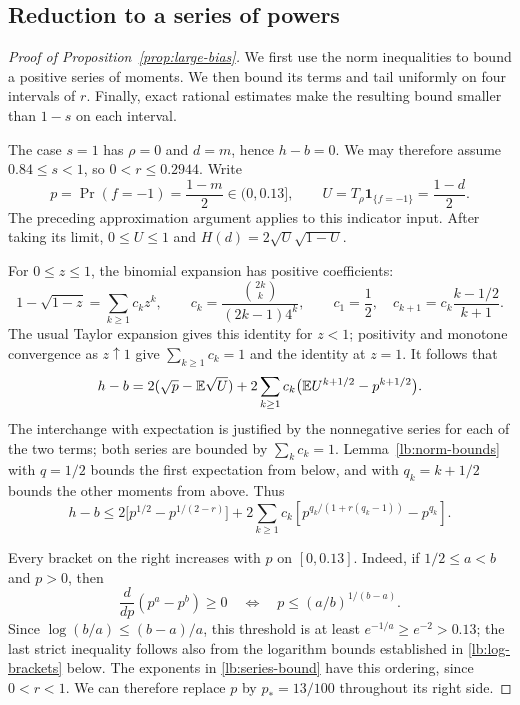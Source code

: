 \subsection{Reduction to a series of powers}

\begin{proof}[Proof of Proposition~\ref{prop:large-bias}]
We first use the norm inequalities to bound a positive series of moments.
We then bound its terms and tail uniformly on four intervals of $r$.
Finally, exact rational estimates make the resulting bound smaller than
$1-s$ on each interval.

The case $s=1$ has $\rho=0$ and $d=m$, hence $h-b=0$.
We may therefore assume $0.84\le s<1$, so $0<r\le0.2944$.
Write
\[
 p=\Pr(f=-1)=\frac{1-m}{2}\in(0,0.13],\qquad
 U=T_\rho\mathbf1_{\{f=-1\}}=\frac{1-d}{2}.
\]
The preceding approximation argument applies to this indicator input.
After taking its limit, $0\le U\le1$ and
$H(d)=2\sqrt U\sqrt{1-U}$.

For $0\le z\le1$, the binomial expansion has positive coefficients:
\begin{equation}\label{lb:binomial}
 1-\sqrt{1-z}=\sum_{k\ge1}c_kz^k,\qquad
 c_k=\frac{\binom{2k}{k}}{(2k-1)4^k},\qquad
 c_1=\frac12,\quad
 c_{k+1}=c_k\frac{k-1/2}{k+1}.
\end{equation}
The usual Taylor expansion gives this identity for $z<1$; positivity
and monotone convergence as $z\uparrow1$ give $\sum_{k\ge1}c_k=1$ and
the identity at $z=1$. It follows that
\begin{equation}\label{lb:series-identity}
 h-b
 =2(\sqrt p-\mathbb E\sqrt U)
  +2\sum_{k\ge1}c_k\bigl(\mathbb E U^{k+1/2}-p^{k+1/2}\bigr).
\end{equation}
The interchange with expectation is justified by the nonnegative
series for each of the two terms; both series are bounded by
$\sum_kc_k=1$.
Lemma~\ref{lb:norm-bounds} with $q=1/2$ bounds the first expectation
from below, and with $q_k=k+1/2$ bounds the other moments from above.
Thus
\begin{equation}\label{lb:series-bound}
 h-b\le
 2\bigl[p^{1/2}-p^{1/(2-r)}\bigr]
 +2\sum_{k\ge1}c_k
 \left[p^{q_k/(1+r(q_k-1))}-p^{q_k}\right].
\end{equation}

Every bracket on the right increases with $p$ on $[0,0.13]$.
Indeed, if $1/2\le a<b$ and $p>0$, then
\[
 \frac{d}{dp}(p^a-p^b)\ge0
 \quad\Longleftrightarrow\quad
 p\le(a/b)^{1/(b-a)}.
\]
Since $\log(b/a)\le(b-a)/a$, this threshold is at least
$e^{-1/a}\ge e^{-2}>0.13$; the last strict inequality follows also
from the logarithm bounds established in \eqref{lb:log-brackets} below.
The exponents in \eqref{lb:series-bound} have this ordering, since
$0<r<1$. We can therefore replace $p$ by
$p_*=13/100$ throughout its right side.


\end{proof}
